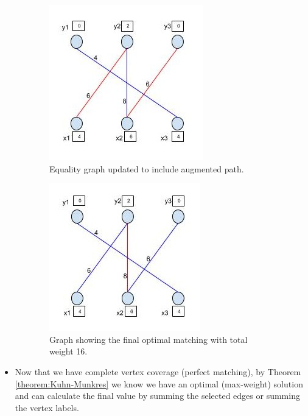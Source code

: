 \documentclass[twoside]{article}
\begin{document}
\begin{figure}[H]
  \centering
  \begin{subfigure}{.45\textwidth}
  	\begin{framed}
    	\centering
    	\includegraphics[width=.75\linewidth]{figure5.jpg}
  	\end{framed}
    \caption{Equality graph updated to include augmented path.}
    \label{fig:example_relabeled}
  \end{subfigure}
  \begin{subfigure}{.1\textwidth}

  \end{subfigure}
  \begin{subfigure}{.45\textwidth}
  	\begin{framed}
    	\centering
    	\includegraphics[width=.75\linewidth]{figure6.jpg}
  	\end{framed}
    \caption{Graph showing the final optimal matching with total weight 16. }
    \label{fig:final_matching}
  \end{subfigure}
  \caption{}
  \label{fig:alg_example2}
\end{figure}

\begin{itemize}
\item Now that we have complete vertex coverage (perfect matching), by Theorem \ref{theorem:Kuhn-Munkres} we know we have an optimal (max-weight) solution and can calculate the final value by summing the selected edges or summing the vertex labels.
\end{itemize}
\end{document}
